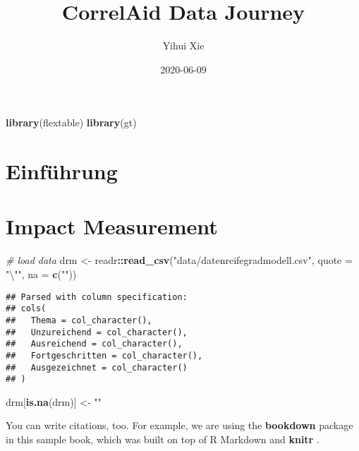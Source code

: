 \documentclass[]{book}
\title{CorrelAid Data Journey}
\author{Yihui Xie}
\date{2020-06-09}
\newenvironment{Shaded}{\begin{snugshade}}{\end{snugshade}}
\newcommand{\CharTok}[1]{\textcolor[rgb]{0.31,0.60,0.02}{#1}}
\newcommand{\CommentTok}[1]{\textcolor[rgb]{0.56,0.35,0.01}{\textit{#1}}}
\newcommand{\DataTypeTok}[1]{\textcolor[rgb]{0.13,0.29,0.53}{#1}}
\newcommand{\KeywordTok}[1]{\textcolor[rgb]{0.13,0.29,0.53}{\textbf{#1}}}
\newcommand{\NormalTok}[1]{#1}
\newcommand{\OperatorTok}[1]{\textcolor[rgb]{0.81,0.36,0.00}{\textbf{#1}}}
\newcommand{\StringTok}[1]{\textcolor[rgb]{0.31,0.60,0.02}{#1}}
\begin{document}
\maketitle

{
\setcounter{tocdepth}{1}
\tableofcontents
}
\begin{Shaded}
\begin{Highlighting}[]
\KeywordTok{library}\NormalTok{(flextable)}
\KeywordTok{library}\NormalTok{(gt)}
\end{Highlighting}
\end{Shaded}

\hypertarget{einfuxfchrung}{%
\chapter{Einführung}\label{einfuxfchrung}}

\hypertarget{impact-measurement}{%
\chapter{Impact Measurement}\label{impact-measurement}}

\begin{Shaded}
\begin{Highlighting}[]
\CommentTok{# load data }
\NormalTok{drm <-}\StringTok{ }\NormalTok{readr}\OperatorTok{::}\KeywordTok{read_csv}\NormalTok{(}\StringTok{"data/datenreifegradmodell.csv"}\NormalTok{, }\DataTypeTok{quote =} \StringTok{"}\CharTok{\textbackslash{}"}\StringTok{"}\NormalTok{, }\DataTypeTok{na =} \KeywordTok{c}\NormalTok{(}\StringTok{""}\NormalTok{))}
\end{Highlighting}
\end{Shaded}

\begin{verbatim}
## Parsed with column specification:
## cols(
##   Thema = col_character(),
##   Unzureichend = col_character(),
##   Ausreichend = col_character(),
##   Fortgeschritten = col_character(),
##   Ausgezeichnet = col_character()
## )
\end{verbatim}

\begin{Shaded}
\begin{Highlighting}[]
\NormalTok{drm[}\KeywordTok{is.na}\NormalTok{(drm)] <-}\StringTok{ ""}
\end{Highlighting}
\end{Shaded}

You can write citations, too. For example, we are using the \textbf{bookdown} package in this sample book, which was built on top of R Markdown and \textbf{knitr} \citep{xie2015}.
\end{document}
